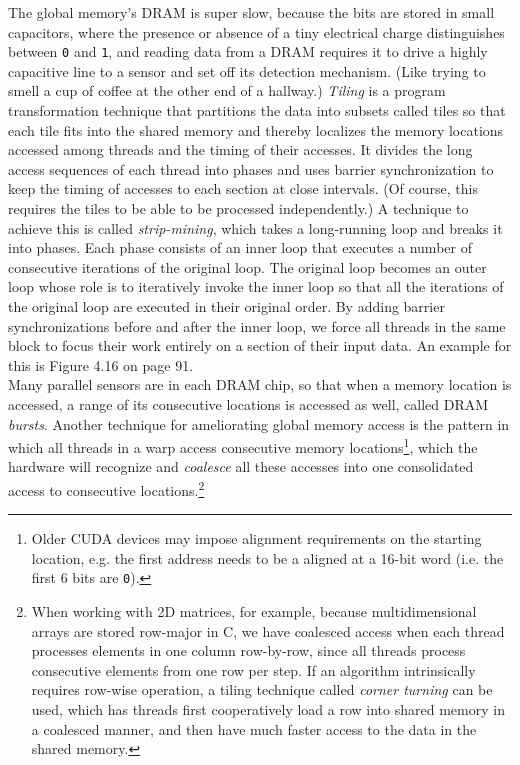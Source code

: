 \documentclass[8pt, table, xcdraw]{article}%
\begin{document}
The global memory's DRAM is super slow, because the bits are stored in small capacitors, where the presence or absence of a tiny electrical charge distinguishes between \lstinline{0} and \lstinline{1}, and reading data from a DRAM requires it to drive a highly capacitive line to a sensor and set off its detection mechanism. (Like trying to smell a cup of coffee at the other end of a hallway.) \emph{Tiling} is a program transformation technique that partitions the data into subsets called tiles so that each tile fits into the shared memory and thereby localizes the memory locations accessed among threads and the timing of their accesses. It divides the long access sequences of each thread into phases and uses barrier synchronization to keep the timing of accesses to each section at close intervals. (Of course, this requires the tiles to be able to be processed independently.) A technique to achieve this is called \emph{strip-mining}, which takes a long-running loop and breaks it into phases. Each phase consists of an inner loop that executes a number of consecutive iterations of the original loop. The original loop becomes an outer loop whose role is to iteratively invoke the inner loop so that all the iterations of the original loop are executed in their original order. By adding barrier synchronizations before and after the inner loop, we force all threads in the same block to focus their work entirely on a section of their input data. An example for this is Figure 4.16 on page 91.\\
Many parallel sensors are in each DRAM chip, so that when a memory location is accessed, a range of its consecutive locations is accessed as well, called DRAM \emph{bursts}. Another technique for ameliorating global memory access is the pattern in which all threads in a warp access consecutive memory locations\footnote{Older CUDA devices may impose alignment requirements on the starting location, e.g. the first address needs to be a aligned at a 16-bit word (i.e. the first 6 bits are \lstinline{0}).}, which the hardware will recognize and \emph{coalesce} all these accesses into one consolidated access to consecutive locations.\footnote{When working with 2D matrices, for example, because multidimensional arrays are stored row-major in C, we have coalesced access when each thread processes elements in one column row-by-row, since all threads process consecutive elements from one row per step. If an algorithm intrinsically requires row-wise operation, a tiling technique called \emph{corner turning} can be used, which has threads first cooperatively load a row into shared memory in a coalesced manner, and then have much faster access to the data in the shared memory.}
\end{document}

